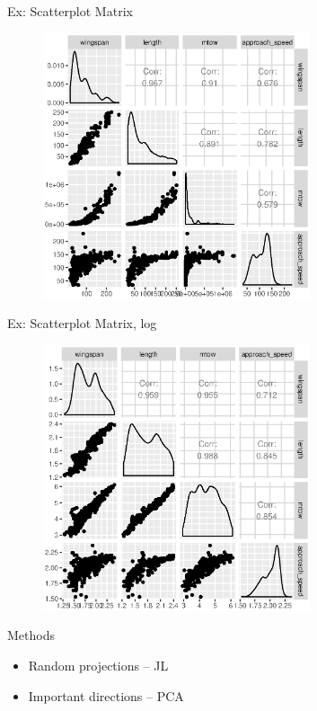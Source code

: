 \documentclass[14pt]{beamer}
\begin{document}
\begin{frame}{Ex: Scatterplot Matrix}
  \begin{figure}
    \centering\includegraphics[width=0.7\textwidth]{./images/faa_min_scatter}
  \end{figure}
\end{frame}

\begin{frame}{Ex: Scatterplot Matrix, log}
  \begin{figure}
    \centering\includegraphics[width=0.7\textwidth]{./images/faa_min_scatter_log}
  \end{figure}
\end{frame}

\begin{frame}{Methods}
  \begin{itemize}
  \item Random projections -- JL
  \item Important directions -- PCA
  \end{itemize}
\end{frame}
\end{document}
